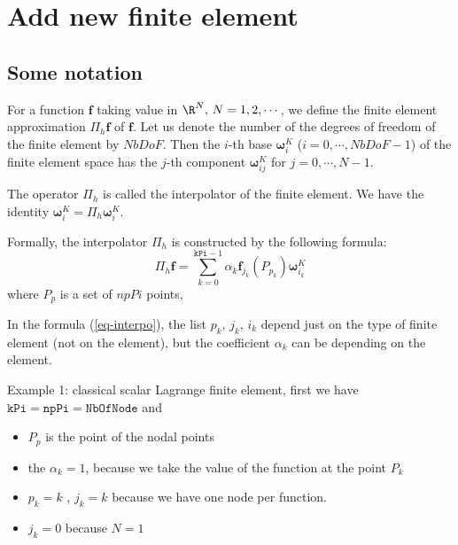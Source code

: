 \section{Add new finite element}
\label{AddnewFE}
\subsection{Some notation}
\def\Fb#1{\boldsymbol{\omega}^{K}_{#1}}
\def\fbi{\mathbf{\omega}^{K}_{ij}}


For a function $\boldsymbol{f}$ taking value in $\R^{N},\,
N=1,2,\cdots$, we define the finite element approximation $\Pi_h
\boldsymbol{f}$ of $\boldsymbol{f}$. Let us denote the number of the
degrees of freedom of the finite element by $NbDoF$. Then the $i$-th
base  $\boldsymbol{\omega}^{K}_{i}$ ($i=0,\cdots,NbDoF-1$) of the
finite element space has the $j$-th component
$\mathbf{\omega}^{K}_{ij}$ for $j=0,\cdots,N-1$.

The operator  $\Pi_{h}$ is called the interpolator of the finite element.
We have the identity $\boldsymbol{\omega}^{K}_{i} =  \Pi_{h} \boldsymbol{\omega}^{K}_{i} $.

Formally, the interpolator $\Pi_{h}$ is constructed by the following formula:
\begin{equation}
\label{eq-interpo}
\Pi_{h} \boldsymbol{f} = \sum_{k=0}^{\mathtt{kPi}-1} \alpha_k \boldsymbol{f}_{j_{k}}(P_{p_{k}}) \boldsymbol{\omega}^{K}_{i_{k}}
\end{equation}
where $P_{p}$ is a set of $npPi$ points,

In the formula (\ref{eq-interpo}), the list $ p_{k},\, j_{k},\, i_{k}$ depend just on  the type of finite element (not on the element), but the coefficient  $\alpha_{k}$ can be depending on the element.

\medskip
 Example 1: classical scalar  Lagrange finite element, first we have $\mathtt{kPi}=\mathtt{npPi}=\mathtt{NbOfNode}$ and
\begin{itemize}
\item $P_{p}$ is the point of the nodal points
\item  the $\alpha_k=1$, because we take the value  of the function at the point $P_{k}$
\item $p_{k}=k$ ,  $j_{k}=k$ because we have one node per  function.
\item $j_{k}=0$ because $N=1$
\end{itemize}

